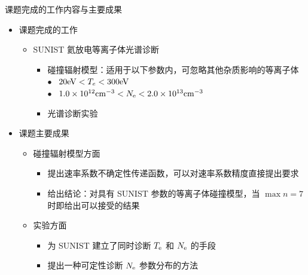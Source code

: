 \begin{CJK*}{UTF8}{kai}
\begin{frame}{课题完成的工作内容与主要成果}
	\begin{itemize}
		\item 课题完成的工作
			\begin{itemize}
				\item SUNIST 氦放电等离子体光谱诊断
					\begin{itemize}
						\item 碰撞辐射模型：适用于以下参数内，可忽略其他杂质影响的等离子体\\%
								{\footnotesize
								{\color{thupurple}\quad\tiny{}\hbox{{$\bullet$}}}~ $20{\rm eV}<T_e<300{\rm eV}$ \\
								{\color{thupurple}\quad\tiny{}\hbox{{$\bullet$}}}~ $1.0\times10^{12}{\rm cm}^{-3}<N_{\rm e}<2.0\times10^{13}{\rm cm}^{-3}$
								}
						\item 光谱诊断实验%
					\end{itemize}
			\end{itemize}
		\bigskip
		\item 课题主要成果
			\begin{itemize}
				\item 碰撞辐射模型方面
					\begin{itemize}
						\item 提出速率系数不确定性传递函数，可以对速率系数精度直接提出要求
						\item 给出结论：对具有 SUNIST 参数的等离子体碰撞模型，当 $\max n=7$ 时即给出可以接受的结果
					\end{itemize}
				\item 实验方面
					\begin{itemize}
						\item 为 SUNIST 建立了同时诊断 $T_{\rm e}$ 和 $N_{\rm e}$ 的手段
						\item 提出一种可定性诊断 $N_{\rm e}$ 参数分布的方法
					\end{itemize}
			\end{itemize}
	\end{itemize}
\end{frame}


\end{CJK*}
